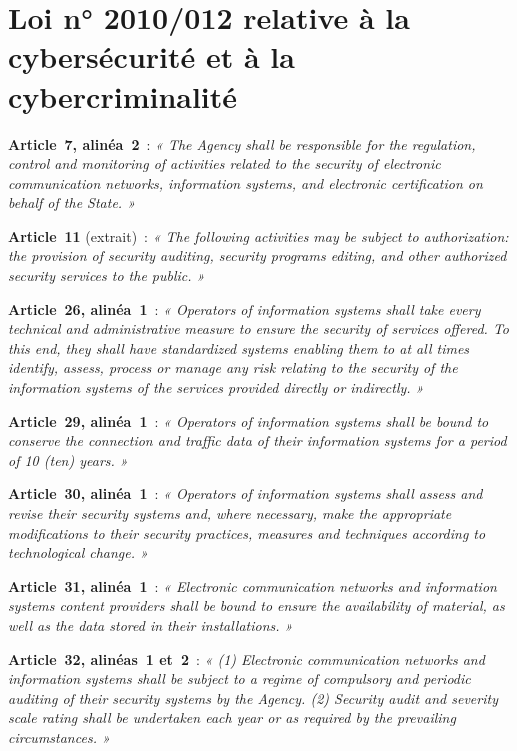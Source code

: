 \section*{Loi n° 2010/012 relative à la cybersécurité et à la cybercriminalité}

\begin{boxjuris}
\textbf{Article~7, alinéa~2}~: \textit{« The Agency \textelp{} shall be
responsible for the regulation, control and monitoring of activities related
to the security of electronic communication networks, information systems,
and electronic certification on behalf of the State. »}

\medskip
\textbf{Article~11} (extrait)~: \textit{« The following activities may be
subject to authorization: \textelp{} the provision of security auditing,
security programs editing, and other authorized security services to the
public. »}

\medskip
\textbf{Article~26, alinéa~1}~: \textit{« Operators of information systems
shall take every technical and administrative measure to ensure the security
of services offered. To this end, they shall have standardized systems
enabling them to at all times identify, assess, process or manage any risk
relating to the security of the information systems of the services
provided directly or indirectly. »}

\medskip
\textbf{Article~29, alinéa~1}~: \textit{« Operators of information systems
shall be bound to conserve the connection and traffic data of their
information systems for a period of 10 (ten) years. »}

\medskip
\textbf{Article~30, alinéa~1}~: \textit{« Operators of information systems
shall assess and revise their security systems and, where necessary, make
the appropriate modifications to their security practices, measures and
techniques according to technological change. »}

\medskip
\textbf{Article~31, alinéa~1}~: \textit{« Electronic communication networks
and information systems content providers shall be bound to ensure the
availability of material, as well as the data stored in their
installations. »}

\medskip
\textbf{Article~32, alinéas~1 et~2}~: \textit{« (1) Electronic
communication networks and information systems shall be subject to a regime
of compulsory and periodic auditing of their security systems by the
Agency. (2) Security audit and severity scale rating shall be undertaken
each year or as required by the prevailing circumstances. »}


\end{boxjuris}
